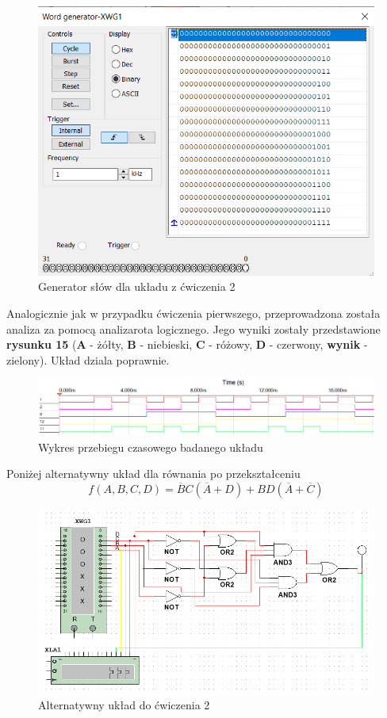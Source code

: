 \documentclass{article}
\begin{document}
\begin{figure}[H]
    \centering
    \includegraphics[width=\textwidth]{generator_2.png}
    \caption{Generator słów dla układu z ćwiczenia 2}
\end{figure}

Analogicznie jak w przypadku ćwiczenia pierwszego, przeprowadzona została analiza za pomocą analizarota logicznego. 
Jego wyniki zostały przedstawione \textbf{rysunku 15} (\textbf{A} - żółty, \textbf{B} - niebieski, \textbf{C} - różowy, 
\textbf{D} - czerwony, \textbf{wynik} - zielony). Układ dziala poprawnie.

\begin{figure}[H]
    \centering
    \includegraphics[width=\textwidth]{analiza_2.png}
    \caption{Wykres przebiegu czasowego badanego układu}
\end{figure}

\newpage
Poniżej alternatywny układ dla równania po przekształceniu
\[f(A,B,C,D)=\overline{B}C(\overline{A}+D)+BD(\overline{A}+\overline{C})\]

\begin{figure}[H]
    \centering
    \includegraphics[width=\textwidth]{uklad_2_improved.png}
    \caption{Alternatywny układ do ćwiczenia 2}
\end{figure}
\end{document}
